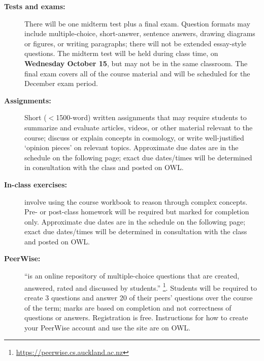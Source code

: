 \documentclass[12pt]{article}
\begin{document}
\begin{description}
\item[\bf Tests and exams:] There will be one midterm test plus a final exam. 
Question formats may include multiple-choice, short-answer, sentence answers, drawing diagrams or figures, or writing paragraphs;
there will not be extended essay-style questions. 
The midterm test will be held during class time, on {\bf  Wednesday October 15}, but may not be in the same classroom.
The final exam covers all of the course material and will be scheduled for the December exam period.

\item[\bf Assignments:] Short ($<$1500-word) written assignments that may require students to summarize and evaluate articles, videos, or
other material relevant to the course; discuss or explain concepts in cosmology, or write well-justified `opinion pieces' on relevant topics.
Approximate due dates are in the schedule on the following page; exact due dates/times will be determined in consultation with the class
and posted on OWL.

\item[\bf In-class exercises:] involve using the course workbook to reason through complex concepts. Pre- or post-class homework
will be required but marked for completion only. Approximate due dates are in the schedule on the following page; exact due dates/times 
will be determined in consultation with the class and posted on OWL.

\item[\bf PeerWise:]  ``is an online repository of multiple-choice questions that are created, answered, rated and discussed by students.''%
\footnote{\url{https://peerwise.cs.auckland.ac.nz}}.  Students will be required to create 3 questions and answer
20 of their peers' questions over the course of the term; marks are based on completion and not correctness of questions or answers.
Registration is free. Instructions for how to create your PeerWise account and use the site are on OWL.

\end{description}

\clearpage
\end{document}
